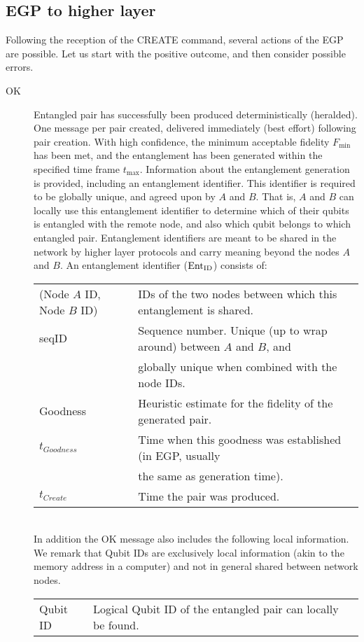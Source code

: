 \documentclass{article}
\newcommand{\entid}{{\rm Ent}_{\rm ID}}
\begin{document}
\subsection{EGP to higher layer}
Following the reception of the CREATE command, several actions of the EGP are possible. Let us start with the positive outcome, and then consider possible
errors. 
\begin{description}
\item[OK] Entangled pair has successfully been produced deterministically (heralded). One message per pair created, delivered immediately (best effort) following pair creation. 
With high confidence, the minimum acceptable fidelity $F_{\min}$ has been met, and the entanglement has been generated
within the specified time frame $t_{\max}$. Information about the entanglement generation is provided, including an entanglement identifier. This identifier is required 
to be globally unique, and agreed upon by $A$ and $B$. That is, $A$ and $B$ can locally use this entanglement identifier to determine which of their qubits is entangled with the remote
node, and also which qubit belongs to which entangled pair. Entanglement identifiers are meant to be shared in the network by higher layer protocols and carry meaning beyond the nodes
$A$ and $B$. An entanglement identifier ($\entid$) consists of:\\
\noindent
\begin{tabular}{ll}
(Node $A$ ID, Node $B$ ID) & IDs of the two nodes between which this entanglement is shared.\\
seqID & Sequence number. Unique (up to wrap around) between $A$ and $B$, and \\
& globally unique when combined with the node IDs.\\
Goodness & Heuristic estimate for the fidelity of the generated pair.\\
$t_{Goodness}$ & Time when this goodness was established (in EGP, usually \\
& the same as generation time).\\
$t_{Create}$ & Time the pair was produced.\\
\end{tabular}\\

\smallskip
\noindent
In addition the OK message also includes the following local information. We remark that Qubit IDs are exclusively local information (akin to the memory address
in a computer) and not in general shared between network nodes.\\
\noindent
\begin{tabular}{ll}
Qubit ID & Logical Qubit ID of the entangled pair can locally be found.
\end{tabular}
\end{description}
\end{document}
